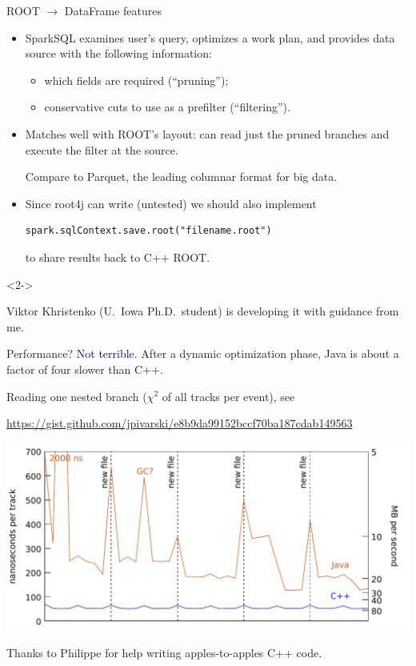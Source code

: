 \documentclass{beamer}
\begin{document}
\begin{frame}[fragile]{ROOT $\to$ DataFrame features}
\vspace{0.5 cm}
\begin{itemize}\setlength{\itemsep}{0.25 cm}
\item SparkSQL examines user's query, optimizes a work plan, and provides data source with the following information:
\begin{itemize}
\item which fields are required (``pruning'');
\item conservative cuts to use as a prefilter (``filtering'').
\end{itemize}

\item Matches well with ROOT's layout: can read just the pruned branches and execute the filter at the source.

\vspace{0.25 cm}
Compare to Parquet, the leading columnar format for big data.

\item Since root4j can write (untested) we should also implement 
\begin{verbatim}
spark.sqlContext.save.root("filename.root")
\end{verbatim}
to share results back to C++ ROOT.
\end{itemize}

\begin{uncoverenv}<2->
\begin{center}
\Large Viktor Khristenko (U.\ Iowa Ph.D.\ student) is developing it with guidance from me.
\end{center}
\end{uncoverenv}
\end{frame}

\begin{frame}{Performance?}
\vspace{0.5 cm}
{\Large \textcolor{darkblue}{Not terrible.} \normalsize After a dynamic optimization phase, Java is about a factor of four slower than C++.}

\vspace{0.25 cm}
\small
Reading one nested branch ($\chi^2$ of all tracks per event), see

\textcolor{blue}{\tiny \url{https://gist.github.com/jpivarski/e8b9da99152bccf70ba187cdab149563}}

\includegraphics[width=\linewidth]{performance.pdf}

\normalsize
Thanks to Philippe for help writing apples-to-apples C++ code.
\end{frame}
\end{document}
